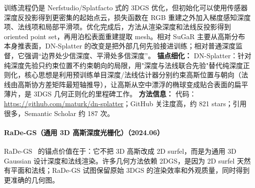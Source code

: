 训练流程仍是 Nerfstudio/Splatfacto 式的 3DGS 优化，但初始化可以使用传感器深度反投影得到更密集的起始点云，损失函数在 RGB 重建之外加入梯度感知深度项、法线项和局部平滑项。优化完成后，方法从渲染深度和法线反投影得到 oriented point set，再用泊松表面重建提取 mesh。相对 SuGaR 主要从高斯分布本身推表面，DN-Splatter 的改变是把外部几何先验接进训练；相对普通深度监督，它强调“边界处少信深度、平滑处多信深度”。
\textbf{锚点细化：} DN-Splatter：针对纯深度先验只约束位置不约束朝向的局限，用"深度与法线联合先验"替代纯深度正则化，核心思想是利用预训练单目深度/法线估计器分别约束高斯位置与朝向（法线由高斯协方差矩阵最短轴推导），让高斯从空中漂浮的椭球变成贴合表面的扁平薄片，是 3DGS 几何正则化的里程碑工作。
\textbf{方法信息：} 代码：\url{https://github.com/maturk/dn-splatter}；GitHub 关注度高，约 821 stars；引用很多，Semantic Scholar 约 187 次。



\paragraph{RaDe-GS（通用 3D 高斯深度光栅化）（2024.06）}
RaDe-GS~\cite{2406_01467} 的锚点价值在于：它不把 3D 高斯改成 2D surfel，而是为通用 3D Gaussian 设计深度和法线渲染。许多几何方法依赖 2DGS，是因为 2D surfel 天然有平面和法线；RaDe-GS 试图保留原始 3DGS 的渲染效率和外观质量，同时得到更准确的几何图。

